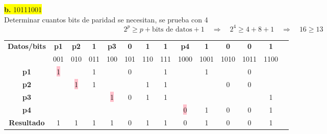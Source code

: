 \documentclass{article}
\begin{document}
	\begin{center}
		\hspace{3cm}\colorbox{yellow}{{\textbf{b.} 10111001}}\newline
		\\Determinar cuantos bits de paridad se necesitan, se prueba con 4
		\[
		2^p \geq p + \text{bits de datos} + 1
		\quad \Rightarrow \quad	2^4 \geq 4 + 8 + 1 \quad \Rightarrow \quad 16 \geq 13
		\]
		
		\begin{table}[h!]
			\centering
			\begin{tabular}{c|ccccccccccccc}
				\toprule
				\textbf{Datos/bits} & \textbf{p1} & \textbf{p2} & \textbf{1} & \textbf{p3} & \textbf{0} & \textbf{1} & \textbf{1} & \textbf{p4} & \textbf{1} & \textbf{0} & \textbf{0} & \textbf{1} \\ & \scriptsize001 & \scriptsize010 & \scriptsize011 & \scriptsize100 & \scriptsize101 & \scriptsize110 & \scriptsize111 & \scriptsize1000 & \scriptsize1001 & \scriptsize1010 & \scriptsize1011 & \scriptsize1100 \\
				\midrule
				\textbf{p1} & \colorbox{pink}{1} & & 1 & & 0 & & 1 & & 1 & & 0 &\\
				\midrule
				\textbf{p2} &  & \colorbox{pink}{1} & 1 & & & 1 & 1 & & & 0 & 0 &  \\
				\midrule
				\textbf{p3} &  & & & \colorbox{pink}{1} & 0 & 1 & 1 & & & & & 1 \\
				\midrule
				\textbf{p4} & & & & & & & & \colorbox{pink}{0} & 1 & 0 & 0 & 1 \\
				\midrule
				\midrule
				\textbf{Resultado} & 1 & 1 & 1 & 1 & 0 & 1 & 1 & 0 & 1 & 0 & 0 & 1 \\
				\bottomrule
			\end{tabular}
		\end{table}
	\end{center}
\end{document}
